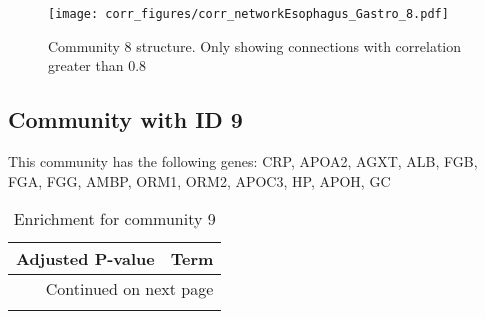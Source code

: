 \begin{figure}[h!]
\centering
\texttt{[image: corr\_figures/corr\_networkEsophagus\_Gastro\_8.pdf]}
\caption{Community 8 structure. Only showing connections with correlation greater than 0.8}
\end{figure}




\subsection*{Community with ID 9}
This community has the following genes: CRP, APOA2, AGXT, ALB, FGB, FGA, FGG, AMBP, ORM1, ORM2, APOC3, HP, APOH, GC
\\
\begin{longtable}{p{2.4cm}p{14.5cm}}
\caption{Enrichment for community 9}\\
\toprule
Adjusted \newline P-value &                                                                                          Term \\
\midrule
\endhead
\midrule
\multicolumn{2}{r}{{Continued on next page}} \\
\midrule
\endfoot


\end{longtable}
